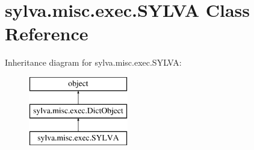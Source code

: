 \hypertarget{classsylva_1_1misc_1_1exec_1_1_s_y_l_v_a}{}\section{sylva.\+misc.\+exec.\+S\+Y\+L\+VA Class Reference}
\label{classsylva_1_1misc_1_1exec_1_1_s_y_l_v_a}
Inheritance diagram for sylva.\+misc.\+exec.\+S\+Y\+L\+VA\+:\begin{figure}[H]
\begin{center}
\leavevmode
\includegraphics[height=3.000000cm]{classsylva_1_1misc_1_1exec_1_1_s_y_l_v_a}
\end{center}
\end{figure}
